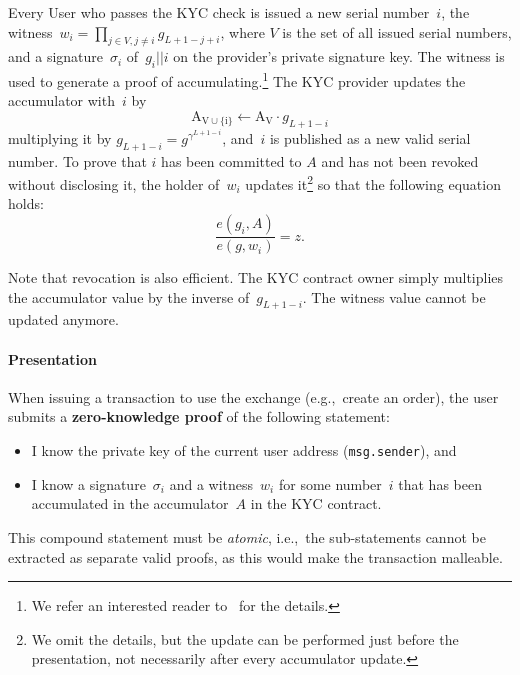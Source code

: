 Every User who passes the KYC check is issued a new serial number~$i$, the witness~$w_i = \prod_{j\in V,j\neq i} g_{L+1-j+i}$, where $V$ is the set of all issued serial numbers, and a signature~$\sigma_i$ of~$g_i||i$ on the provider's private signature key.
The witness is used to generate a proof of accumulating.\footnote{We refer an interested reader to~\cite{Camenisch2009} for the details.}
The KYC provider updates the accumulator with~$i$ by
$$
\mathrm{A_{V\cup\{i\}}} \leftarrow \mathrm{A_V} \cdot g_{L+1-i}
$$
multiplying it by $g_{L+1-i} = g^{\gamma^{L+1-i}}$, and~$i$ is published as a new valid serial number.
To prove that $i$ has been committed to $A$ and has not been revoked without disclosing it, the holder of~$w_i$ updates it\footnote{We omit the details, but the update can be performed just before the presentation, not necessarily after every accumulator update.} so that the following equation holds:
$$
\frac{e(g_i, A)}{e(g,w_i)} = z.
$$

Note that revocation is also efficient.
The KYC contract owner simply multiplies the accumulator value by the inverse of~$g_{L+1-i}$.
The witness value cannot be updated anymore.

\paragraph{Presentation} 
When issuing a transaction to use the exchange (e.g.,~create an order), the user submits a \textbf{zero-knowledge proof} of the following statement:
\begin{itemize}
	\item I know the private key of the current user address (\texttt{msg.sender}), and
	\item I know a signature~$\sigma_i$ and a witness~$w_i$ for some number~$i$ that has been accumulated in the
	accumulator~$A$ in the KYC contract.
\end{itemize}
This compound statement must be \textit{atomic}, i.e.,~the sub-statements cannot be extracted as separate valid proofs, as this would make the transaction malleable.

